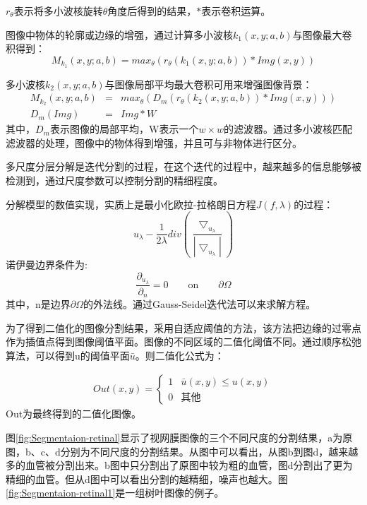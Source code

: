 $r_\theta$表示将多小波核旋转$\theta$角度后得到的结果，$\ast$表示卷积运算。

图像中物体的轮廓或边缘的增强，通过计算多小波核$k_1(x,y;a,b)$与图像最大卷积得到：
\begin{equation}
M_{k_1}(x,y;a,b) = max_\theta(r_\theta(k_1(x,y;a,b)) \ast Img(x,y))
\end{equation} 

多小波核$k_2(x,y;a,b)$与图像局部平均最大卷积可用来增强图像背景：
\begin{eqnarray}
M_{k_2}(x,y;a,b) &=& max_\theta(D_m(r_\theta(k_2(x,y;a,b)) \ast Img(x,y)))\\
D_m(Img) &=& Img\ast W
\end{eqnarray} 
其中，$D_m$表示图像的局部平均，W表示一个$w \times w$的滤波器。通过多小波核匹配滤波器的处理，图像中的物体得到增强，并且可与非物体进行区分。

多尺度分层分解是迭代分割的过程，在这个迭代的过程中，越来越多的信息能够被检测到，通过尺度参数可以控制分割的精细程度。

分解模型的数值实现，实质上是最小化欧拉-拉格朗日方程$J(f,\lambda)$的过程：
\begin{equation}
u_\lambda - \frac{1}{2\lambda}div(\frac{\bigtriangledown_{u_\lambda}}{|\bigtriangledown_{u_\lambda}|})
\end{equation}
诺伊曼边界条件为:
\begin{equation}
\frac{\partial_{u_\lambda}}{\partial_n} = 0 \qquad \textrm{on} \qquad \partial \Omega
\end{equation}
其中，n是边界$\partial \Omega$的外法线。通过Gauss-Seidel迭代法\cite{tadmor,nezzar}可以来求解方程。

为了得到二值化的图像分割结果，采用自适应阈值的方法，该方法把边缘的过零点作为插值点得到图像阈值平面。图像的不同区域的二值化阈值不同。通过顺序松弛算法，可以得到u的阈值平面$\bar{u}$。则二值化公式为：

\begin{align}
Out(x,y) = \left\{ \begin{array}{ll}
1 & \bar{u}(x,y)\leq u(x,y)\\
0 & \textrm{其他}
\end{array} \right.
\end{align}
Out为最终得到的二值化图像。

图\ref{fig:Segmentaion-retinal}显示了视网膜图像的三个不同尺度的分割结果，a为原图，b、c、d分别为不同尺度的分割结果。从图中可以看出，从图b到图d，越来越多的血管被分割出来。b图中只分割出了原图中较为粗的血管，图d分割出了更为精细的血管。但从d图中可以看出分割的越精细，噪声也越大。图\ref{fig:Segmentaion-retinal1}是一组树叶图像的例子。


